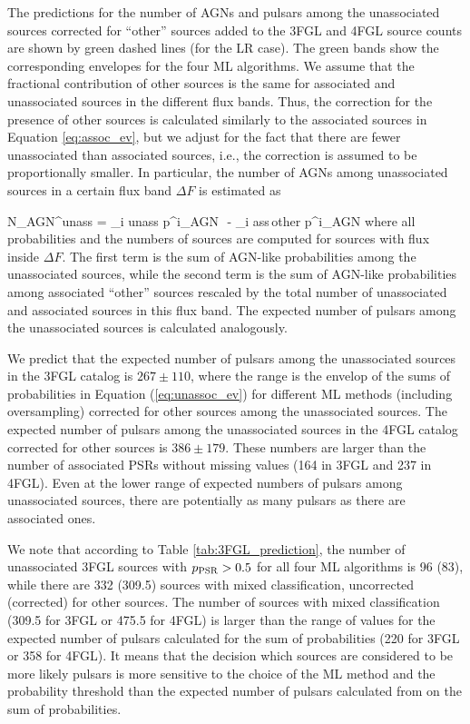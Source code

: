 The predictions for the number of AGNs and pulsars among the unassociated sources corrected for ``other'' sources 
added to the 3FGL and 4FGL source counts are shown by green dashed lines (for the LR case).
The green bands show the corresponding envelopes for the four ML algorithms.
We assume that the fractional contribution of other sources is the same for associated and unassociated sources in the different flux bands.
Thus, the correction for the presence of other sources is calculated similarly to the associated sources in Equation \ref{eq:assoc_ev},
but we adjust for the fact that there are fewer unassociated than associated sources, i.e., 
the correction is assumed to be proportionally smaller.
In particular, the number of AGNs among unassociated sources in a certain flux band $\Delta F$ is estimated as

\be
{}
N_{\rm AGN}^{\rm unass} = \sum_{i \in \rm unass} p^i_{\rm AGN}\,\, - \sum_{i \in \rm ass\,other} p^i_{\rm AGN} \cdot 
{}
\ee
where all probabilities and the numbers of sources are computed for sources with flux inside $\Delta F$.
The first term is the sum of AGN-like probabilities among the unassociated sources,
while the second term is the sum of AGN-like probabilities among associated ``other'' sources rescaled by the total number
of unassociated and associated sources in this flux band.
The expected number of pulsars among the unassociated sources is calculated analogously.

We predict that the expected number of pulsars among the unassociated sources in the 3FGL catalog
is $267 \pm 110$, where the range is the envelop of the sums of probabilities in Equation (\ref{eq:unassoc_ev})
for different ML methods (including oversampling) corrected for other sources among the unassociated sources.
The expected number of pulsars among the unassociated sources in the 4FGL catalog corrected for other sources is 
$386 \pm 179$.
These numbers are larger than the number of associated PSRs without missing values (164 in 3FGL and 237 in 4FGL).
Even at the lower range of expected numbers of pulsars among unassociated sources, there are potentially as many pulsars
as there are associated ones.

We note that according to Table \ref{tab:3FGL_prediction}, the number of unassociated 3FGL sources 
with $p_{\rm PSR} > 0.5$ for all four ML algorithms is 96 (83), while there are 332 (309.5) sources with mixed classification,
uncorrected (corrected) for other sources.
The number of sources with mixed classification (309.5 for 3FGL or 475.5 for 4FGL)
is larger than the range of values for the expected number of pulsars calculated for the sum of probabilities 
(220 for 3FGL or 358 for 4FGL).
It means that the decision which sources are considered to be more likely pulsars is more sensitive to the choice of the ML method
and the probability threshold than the expected number of pulsars calculated from on the sum of probabilities.


